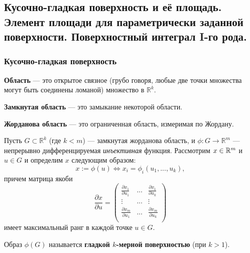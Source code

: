 \subsection{Кусочно-гладкая поверхность и её площадь. Элемент площади для параметрически заданной поверхности. Поверхностный интеграл I-го рода.}
\subsubsection{Кусочно-гладкая поверхность}

\begin{definition*}
    \textbf{Область} --- это открытое связное (грубо говоря, любые две точки множества могут быть соединены ломаной) множество в $\mathbb{R}^k$.
\end{definition*}

\begin{definition*}
    \textbf{Замкнутая область} --- это замыкание некоторой области.
\end{definition*}

\begin{definition*}
    \textbf{Жорданова область} --- это ограниченная область, измеримая по Жордану.
\end{definition*}

Пусть $G \subset \mathbb{R}^k$ (где $k < m$) --- замкнутая жорданова область, и $\phi: G \rightarrow \mathbb{R}^m$ --- непрерывно дифференцируемая \textit{инъективная} функция. Рассмотрим $x \in \mathbb{R}^m$ и  $u \in G$ и определим $x$ следующим образом:
\begin{equation*}
    x := \phi(u) \iff x_i = \phi_i(u_1, ..., u_k),
\end{equation*}
причем матрица якоби
\begin{equation*}
    \dfrac{\partial x}{\partial u} 
    = 
    \begin{pmatrix}
        \frac{\partial x_1}{\partial u_1} & ... & \frac{\partial x_1}{\partial u_k} \\
        \vdots & ... & \vdots \\
        \frac{\partial x_m}{\partial u_1} & ... & \frac{\partial x_m}{\partial u_k} \\
    \end{pmatrix}
\end{equation*}
имеет максимальный ранг в каждой точке $u \in G$.

\begin{definition*}
    Образ $\phi(G)$ называется \textbf{гладкой $k$-мерной поверхностью} (при $k > 1$).
\end{definition*}

